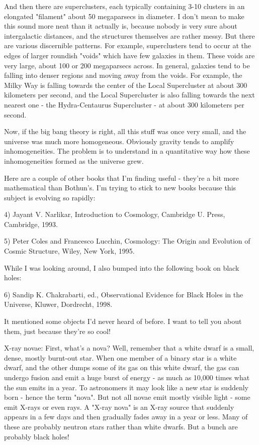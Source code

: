 And then there are superclusters, each typically containing 3-10
clusters in an elongated "filament" about 50 megaparsecs in
diameter.  I don't mean to make this sound more neat than it actually
is, because nobody is very sure about intergalactic distances, and the
structures themselves are rather messy.  But there are various discernible
patterns.  For example, superclusters tend to occur at the edges of
larger roundish "voids" which have few galaxies in them.
These voids are very large, about 100 or 200 megaparsecs across.  In
general, galaxies tend to be falling into denser regions and moving away
from the voids.  For example, the Milky Way is falling towards the
center of the Local Supercluster at about 300 kilometers per second, and
the Local Supercluster is also falling towards the next nearest one -
the Hydra-Centaurus Supercluster - at about 300 kilometers per second.

Now, if the big bang theory is right, all this stuff was once very 
small, and the universe was much more homogeneous.  Obviously gravity
tends to amplify inhomogeneities.  The problem is to understand in a
quantitative way how these inhomogeneities formed as the universe grew.

Here are a couple of other books that I'm finding useful - they're
a bit more mathematical than Bothun's.  I'm trying to stick to new
books because this subject is evolving so rapidly:

4) Jayant V. Narlikar, Introduction to Cosmology, Cambridge U. 
Press, Cambridge, 1993.

5) Peter Coles and Francesco Lucchin, Cosmology: The Origin and
Evolution of Cosmic Structure, Wiley, New York, 1995.

While I was looking around, I also bumped into the following book on
black holes:

6) Sandip K. Chakrabarti, ed., Observational Evidence for Black Holes
in the Universe, Kluwer, Dordrecht, 1998.

It mentioned some objects I'd never heard of before.  I want to tell you
about them, just because they're so cool!

X-ray novae: First, what's a nova?  Well, remember that a white dwarf is
a small, dense, mostly burnt-out star.  When one member of a binary star
is a white dwarf, and the other dumps some of its gas on this white
dwarf, the gas can undergo fusion and emit a huge burst of energy - as
much as 10,000 times what the sun emits in a year.  To astronomers it
may look like a new star is suddenly born - hence the term
"nova".  But not all novae emit mostly visible light - some
emit X-rays or even \gamma  rays.  A "X-ray nova" is an X-ray
source that suddenly appears in a few days and then gradually fades away
in a year or less.  Many of these are probably neutron stars rather than
white dwarfs.  But a bunch are probably black holes!

